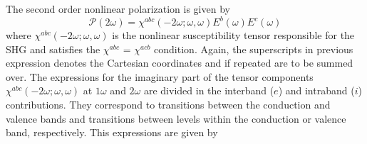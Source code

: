 \documentclass[pss]{wiley2sp} %
\begin{document}
The second order nonlinear polarization is given by 
\begin{equation*}\label{eq:pol}
\mathcal{P}(2\omega) = \chi^{abc}(-2\omega;\omega,\omega)E^{b}(\omega)E^{c}(\omega)
\end{equation*}
where $\chi^{abc}(-2\omega;\omega,\omega)$ is the nonlinear susceptibility tensor responsible for the SHG and satisfies the $\chi^{abc}$ = $\chi^{acb}$ condition. Again, the superscripts in previous expression denotes the Cartesian coordinates and if repeated are to be summed over. The expressions for the imaginary part of the tensor components $\chi^{abc}(-2\omega;\omega,\omega)$ at $1\omega$ and $2\omega$ are divided in the interband ($e$) and intraband ($i$) contributions. They correspond to transitions between the conduction and valence bands and transitions between levels within the conduction or valence band, respectively. This expressions are given by
\end{document}
